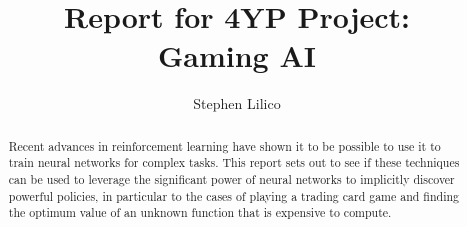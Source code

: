 \documentclass[twoside,12pt]{article}
\title{Report for 4YP Project: \\ Gaming AI}
\author{Stephen Lilico}
\begin{document}
  \maketitle
  
  \newpage
  
  \newpage
  \begin{abstract}
	Recent advances in reinforcement learning have shown it to be possible to use it to train neural networks for complex tasks. This report sets out to see if these techniques can be used to leverage the significant power of neural networks to implicitly discover powerful policies, in particular to the cases of playing a trading card game and finding the optimum value of an unknown function that is expensive to compute.
	
  \end{abstract}
  \tableofcontents 
  
  
  
  
  
  
  
  
  
  
  
\end{document}
